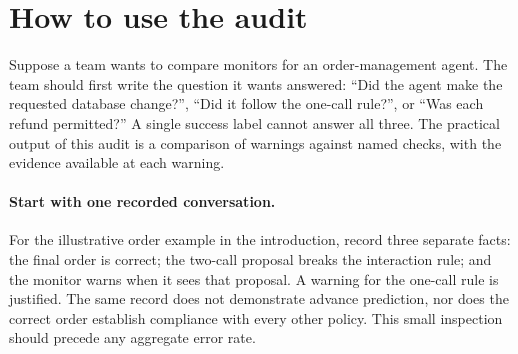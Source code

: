 \section{How to use the audit}
\label{sec:use}
Suppose a team wants to compare monitors for an order-management agent. The team should first write the question it wants answered: ``Did the agent make the requested database change?'', ``Did it follow the one-call rule?'', or ``Was each refund permitted?'' A single success label cannot answer all three. The practical output of this audit is a comparison of warnings against named checks, with the evidence available at each warning.

\paragraph{Start with one recorded conversation.}
For the illustrative order example in the introduction, record three separate facts: the final order is correct; the two-call proposal breaks the interaction rule; and the monitor warns when it sees that proposal. A warning for the one-call rule is justified. The same record does not demonstrate advance prediction, nor does the correct order establish compliance with every other policy. This small inspection should precede any aggregate error rate.

